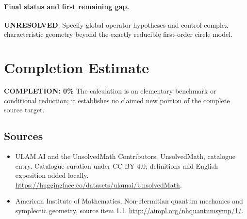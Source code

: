 \documentclass[11pt]{article}
\begin{document}
\paragraph{Final status and first remaining gap.}
\textbf{UNRESOLVED}. Specify global operator hypotheses and control complex characteristic geometry beyond the exactly reducible first-order circle model.

\section{Completion Estimate}
\noindent\textbf{COMPLETION: 0\%}
The calculation is an elementary benchmark or conditional reduction; it establishes no claimed new portion of the complete source target.

\subsection{Sources}
\begin{itemize}
\item[\hypertarget{source:statement:1}{S1}] ULAM.AI and the UnsolvedMath Contributors, UnsolvedMath, catalogue entry. Catalogue curation under CC BY 4.0; definitions and English exposition added locally.
\url{https://huggingface.co/datasets/ulamai/UnsolvedMath}.
\item[\hypertarget{source:statement:2}{S2}] American Institute of Mathematics, Non-Hermitian quantum mechanics and symplectic geometry, source item 1.1.
\url{http://aimpl.org/nhquantumsymp/1/}.
\end{itemize}
\label{end:statement}
\end{document}
